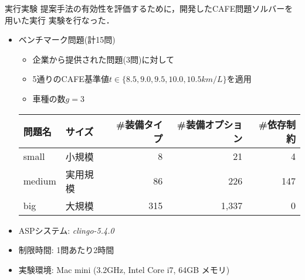 \documentclass[dvipdfmx, 11pt]{beamer}
\begin{document}
\begin{frame}{実行実験}
提案手法の有効性を評価するために，開発したCAFE問題ソルバーを用いた実行
実験を行なった．
\vfill
\begin{itemize}
\item ベンチマーク問題(計15問)
  \begin{itemize}
  \item 企業から提供された問題(3問)に対して
  \item 5通りのCAFE基準値$t\in\{8.5, 9.0, 9.5, 10.0, 10.5km/L\}$を適用
  \item 車種の数$g = 3$
  \end{itemize}
  \begin{exampleblock}\small
    \centering
    \begin{tabular}{ ll|r r r }
      問題名 & サイズ &  \#装備タイプ & \#装備オプション& \#依存制約\\ \hline
      small	 & 小規模   &   8 &   21  &   4	\\
      medium & 実用規模 &  86 &  226  & 147	\\
      big    & 大規模   & 315 & 1,337 &   0
    \end{tabular}
  \end{exampleblock}
\item ASPシステム: \textit{clingo-5.4.0}
\item 制限時間: 1問あたり2時間
\item 実験環境: Mac mini (3.2GHz, Intel Core i7, 64GB メモリ)
\end{itemize}
\end{frame}
\end{document}
